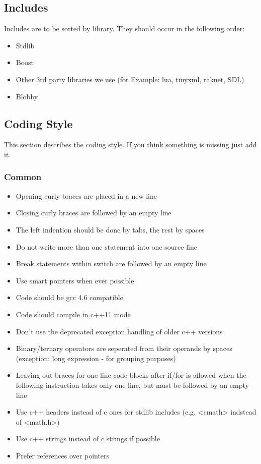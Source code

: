 \documentclass[a4paper]{scrartcl}
\begin{document}
\subsection{Includes}
Includes are to be sorted by library. They should occur in the following order:
\begin{itemize}
	\item Stdlib
	\item Boost
	\item Other 3rd party libraries we use (for Example: lua, tinyxml, raknet, SDL)
	\item Blobby
\end{itemize}



\subsection{Coding Style}
This section describes the coding style. If you think something is missing just add it.


\subsubsection{Common}
\begin{itemize}
	\item Opening curly braces are placed in a new line
	\item Closing curly braces are followed by an empty line
	\item The left indention should be done by tabs, the rest by spaces
	\item Do not write more than one statement into one source line
	\item Break statements within switch are followed by an empty line
	\item Use smart pointers when ever possible
	\item Code should be gcc 4.6 compatible
	\item Code should compile in c++11 mode
	\item Don't use the deprecated exception handling of older c++ versions
	\item Binary/ternary operators are seperated from their operands by spaces (exception: long expression - for grouping purposes)
	\item Leaving out braces for one line code blocks after if/for is allowed when the following instruction takes only one line, but must be followed by an empty line 
	\item Use c++ headers instead of c ones for stdlib includes (e.g. <cmath> indstead of <math.h>)
	\item Use c++ strings instead of c strings if possible
	\item Prefer references over pointers
\end{itemize}
\end{document}
